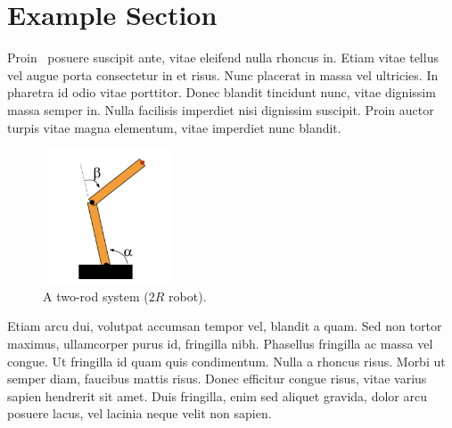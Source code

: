 \documentclass[12pt]{article}
\theoremstyle{definition}
\begin{document}

\newpage
\tableofcontents
\newpage


\section*{\centering Example Section}

Proin~\cite{munkres2000} posuere suscipit ante, vitae eleifend nulla
rhoncus in. Etiam vitae tellus vel augue porta consectetur in et risus.
Nunc placerat in massa vel ultricies. In pharetra id odio vitae porttitor.
Donec blandit tincidunt nunc, vitae dignissim massa semper in. Nulla facilisis
imperdiet nisi dignissim suscipit. Proin auctor turpis vitae magna elementum,
vitae imperdiet nunc blandit.

\begin{figure}[H]
\centering
\includegraphics[width=4cm, height=4cm]{image/two-rod-system}
\caption*{A two-rod system ($2R$ robot).}
\end{figure}

Etiam arcu dui, volutpat accumsan tempor vel, blandit a quam. Sed non tortor
maximus, ullamcorper purus id, fringilla nibh. Phasellus fringilla ac massa
vel congue. Ut fringilla id quam quis condimentum. Nulla a rhoncus risus.
Morbi ut semper diam, faucibus mattis risus. Donec efficitur congue risus,
vitae varius sapien hendrerit sit amet. Duis fringilla, enim sed aliquet
gravida, dolor arcu posuere lacus, vel lacinia neque velit non sapien.


\newpage

\begin{center}
\printbibliography[heading=bibintoc]
\end{center}

\end{document}
